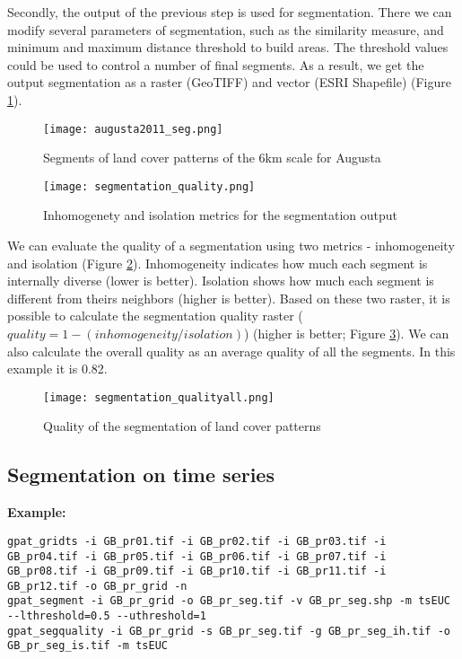 Secondly, the output of the previous step is used for segmentation. 
There we can modify several parameters of segmentation, such as the similarity measure, and minimum and maximum distance threshold to build areas.
The threshold values could be used to control a number of final segments.
As a result, we get the output segmentation as a raster (GeoTIFF) and vector (ESRI Shapefile) (Figure \ref{FIG:SEG1}).

\begin{figure}[H]
	\centering
	\texttt{[image: augusta2011\_seg.png]}
	\caption{Segments of land cover patterns of the 6km scale for Augusta}
	\label{FIG:SEG1}
\end{figure}

\begin{figure}[H]
	\centering
	\texttt{[image: segmentation\_quality.png]}
	\caption{Inhomogenety and isolation metrics for the segmentation output}
	\label{FIG:SEG2}
\end{figure}

We can evaluate the quality of a segmentation using two metrics - inhomogeneity and isolation (Figure \ref{FIG:SEG2}).
Inhomogeneity indicates how much each segment is internally diverse (lower is better).
Isolation shows how much each segment is different from theirs neighbors (higher is better). 
Based on these two raster, it is possible to calculate the segmentation quality raster ($quality = 1 - (inhomogeneity/isolation)$) (higher is better; Figure \ref{FIG:SEG3}).
We can also calculate the overall quality as an average quality of all the segments.
In this example it is 0.82.

\begin{figure}[H]
	\centering
	\texttt{[image: segmentation\_qualityall.png]}
	\caption{Quality of the segmentation of land cover patterns}
	\label{FIG:SEG3}
\end{figure}

\FloatBarrier

\subsection{Segmentation on time series}

{\bf Example:}

\begin{minipage}{\linewidth}
\begin{lstlisting}
gpat_gridts -i GB_pr01.tif -i GB_pr02.tif -i GB_pr03.tif -i GB_pr04.tif -i GB_pr05.tif -i GB_pr06.tif -i GB_pr07.tif -i GB_pr08.tif -i GB_pr09.tif -i GB_pr10.tif -i GB_pr11.tif -i GB_pr12.tif -o GB_pr_grid -n
gpat_segment -i GB_pr_grid -o GB_pr_seg.tif -v GB_pr_seg.shp -m tsEUC --lthreshold=0.5 --uthreshold=1
gpat_segquality -i GB_pr_grid -s GB_pr_seg.tif -g GB_pr_seg_ih.tif -o GB_pr_seg_is.tif -m tsEUC
\end{lstlisting}
\end{minipage}

